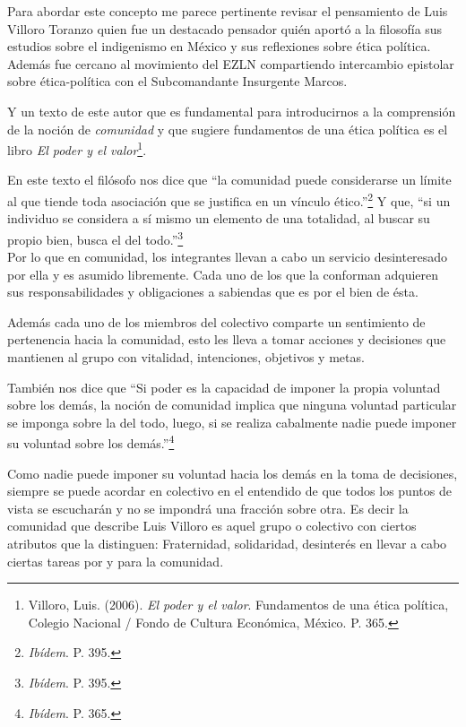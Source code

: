\documentclass[oneside]{book}
\begin{document}
Para abordar este concepto me parece pertinente revisar el pensamiento de Luis Villoro Toranzo quien fue un destacado pensador quién aportó a la filosofía sus estudios sobre el indigenismo en México y sus reflexiones sobre ética política. Además fue cercano al movimiento del EZLN compartiendo intercambio epistolar sobre ética-política con el Subcomandante Insurgente Marcos.

Y un texto de este autor que es fundamental para introducirnos a la comprensión de la noción de \textit{comunidad} y que sugiere fundamentos de una ética política es el libro \textit{El poder y el valor}\footnote{Villoro,  Luis. (2006). \textit{El poder y el valor}. Fundamentos de una ética política, Colegio Nacional / Fondo de Cultura Económica, México. P. 365.}. 

En este texto el filósofo nos dice que “la comunidad puede considerarse un límite al que tiende toda asociación que se justifica en un vínculo ético.”\footnote{\textit{Ibídem}. P. 395.} Y que, “si un individuo se considera a sí mismo un elemento de una totalidad, al buscar su propio bien, busca el del todo.”\footnote{\textit{Ibídem}. P. 395.} 
\\

Por lo que en comunidad, los integrantes llevan a cabo un servicio desinteresado por ella y es asumido libremente. Cada uno de los que la conforman adquieren sus responsabilidades y obligaciones a sabiendas que es por el bien de ésta.

Además cada uno de los miembros del colectivo comparte un sentimiento de pertenencia hacia la comunidad, esto les lleva a tomar acciones y decisiones que mantienen al grupo con vitalidad, intenciones, objetivos y metas.

También nos dice que “Si poder es la capacidad de imponer la propia voluntad sobre los demás, la noción de comunidad implica que ninguna voluntad particular se imponga sobre la del todo, luego, si se realiza cabalmente nadie puede imponer su voluntad sobre los demás.”\footnote{\textit{Ibídem}. P. 365.}

Como nadie puede imponer su voluntad hacia los demás en la toma de decisiones, siempre se puede acordar en colectivo en el entendido de que todos los puntos de vista se escucharán y no se impondrá una fracción sobre otra. 	Es decir la comunidad que describe Luis Villoro es aquel grupo o colectivo con ciertos atributos que la distinguen: Fraternidad, solidaridad, desinterés en llevar a cabo ciertas tareas por y para la comunidad.  
\end{document}
